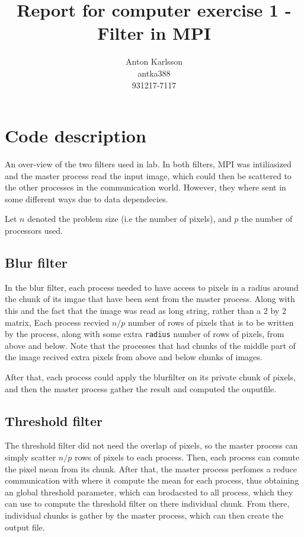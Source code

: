 \documentclass[two column]{article}
\title{Report for computer exercise 1 - Filter in MPI}
\author{Anton Karlsson\\antka388\\931217-7117}
\date{}
\begin{document}
\maketitle

\section{Code description}
\label{sec:code-description}
An over-view of the two filters used in lab. In both filters, MPI was
intiliasized and the master process read the input image, which could
then be scattered to the other processes in the communication
world. However, they where sent in some different ways due to data
dependecies.

Let $n$ denoted the problem size (i.e the number of pixels), and $p$ 
the number of processors used.  

\subsection{Blur filter}
\label{sec:blur-filter}

In the blur filter, each process needed to have access to pixels in a
radius around the chunk of its imgae that have been sent from the
master process. Along with this and the fact that the image was read as
long string, rather than a 2 by 2 matrix, Each process recvied $n/p$
number of rows of pixels that is to be written by the process, along
with some extra \texttt{radius}  number of rows of pixels, from above
and below. Note that the processes that had chunks of the middle part
of the image recived extra pixels from above and below chunks of
images.

After that, each process could apply the blurfilter on its private
chunk of pixels, and then the master process gather the result and
computed the ouputfile.

\subsection{Threshold filter}
\label{sec:threshold-filter}

The threshold filter did not need the overlap of pixels, so the master
process can simply scatter $n/p$ rows of pixels to each process. Then,
each process can comute the pixel mean from its chunk. After that, the
master process perfomes a reduce communication with where it compute
the mean for each process, thus obtaining an global threshold
parameter, which can brodacsted to all process, which they can use to
compute the threshold filter on there individual chunk. From there,
individual chunks is gather by the master process, which can then
create the output file.
\end{document}
